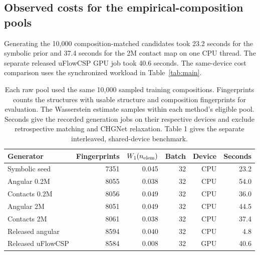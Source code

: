 \subsection{Observed costs for the empirical-composition pools}

Generating the 10,000 composition-matched candidates took 23.2 seconds for the symbolic prior and 37.4 seconds for the 2M contact map on one CPU thread. The separate released uFlowCSP GPU job took 40.6 seconds. The same-device cost comparison uses the synchronized workload in Table~\ref{tab:main}.

\begin{table}[!htbp]\centering\small\setlength{\tabcolsep}{3.6pt}
\caption{Each raw pool used the same 10,000 sampled training compositions. Fingerprints counts the structures with usable structure and composition fingerprints for evaluation. The Wasserstein estimate samples within each method's eligible pool. Seconds give the recorded generation jobs on their respective devices and exclude retrospective matching and CHGNet relaxation. Table 1 gives the separate interleaved, shared-device benchmark.}
\begin{tabular}{lrrrrr}\hline
Generator & Fingerprints & $W_1(n_{\rm elem})$ & Batch & Device & Seconds\\\hline
Symbolic seed & 7351 & 0.045 & 32 & CPU & 23.2\\
Angular 0.2M & 8055 & 0.038 & 32 & CPU & 54.0\\
Contacts 0.2M & 8056 & 0.049 & 32 & CPU & 36.0\\
Angular 2M & 8051 & 0.049 & 32 & CPU & 44.5\\
Contacts 2M & 8061 & 0.038 & 32 & CPU & 37.4\\
Released angular & 8594 & 0.040 & 32 & CPU & 4.8\\
Released uFlowCSP & 8584 & 0.008 & 32 & GPU & 40.6\\
\hline\end{tabular}\end{table}
